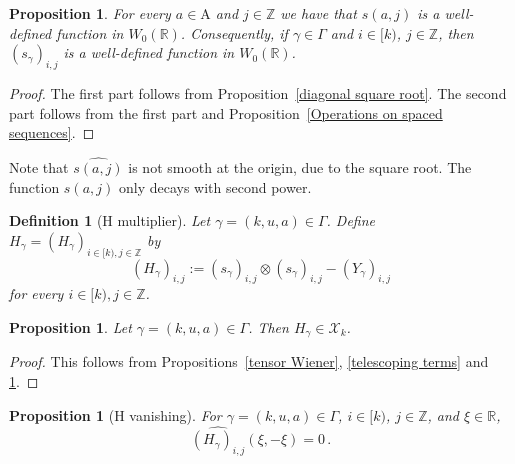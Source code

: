 \documentclass[12pt,reqno]{amsart}
\theoremstyle{plain}
\newtheorem{proposition}[theorem]{Proposition}
\newtheorem{definition}[theorem]{Definition}
\numberwithin{equation}{section}
\theoremstyle{remark}
\newcommand{\uses}[1]{}
\newcommand{\usesdefs}[1]{}
\newcommand{\Z}{{\mathbb Z}}
\newcommand{\R}{{\mathbb R}}
\begin{document}
\begin{proposition}\label{square root Gaussian difference W0}\uses{diagonal square root,Operations on spaced sequences}\usesdefs{auto:Wiener-space-definition,multiplicatively spaced monotone sequences,geometric parameters,square root Gaussian difference,s multiplier}
  For every $a\in\mathrm{A}$ and $j\in\mathbb{Z}$
  we have that $s(a,j)$ is a well-defined function in $W_0(\R)$. Consequently, if $\gamma \in \Gamma$ and $i\in [k)$, $j\in \Z$, then $(s_{\gamma})_{i,j}$ is a well-defined function in $W_0(\R)$.
\end{proposition}

\begin{proof}
The first part follows from Proposition~\ref{diagonal square root}. The second part follows from the first part and Proposition~\ref{Operations on spaced sequences}.
\end{proof}

Note that $\widehat{s(a,j)}$ is not smooth at the origin, due to the square root. The function $s(a,j)$ only decays with second power.


\begin{definition}[H multiplier]\label{H multiplier}\uses{}\usesdefs{geometric parameters,auto:Gaussian-difference-kernel-definition,s multiplier}
Let $\gamma=(k,u,a)\in \Gamma$. Define
    $H_{\gamma}=(H_\gamma)_{i\in [k),j\in \Z}$ by
\begin{equation}\label{auto:H-kernel-definition}
(H_{\gamma})_{i,j}:=(s_{\gamma})_{i,j}\otimes (s_{\gamma})_{i,j}
  -(Y_{\gamma})_{i,j}
\end{equation}
for every $i\in [k), j\in\mathbb{Z}$.
\end{definition}

\begin{proposition}\label{H-in-X}\uses{tensor Wiener,telescoping terms,square root Gaussian difference W0}\usesdefs{geometric parameters,double sequence of 2D functions,H multiplier}
Let $\gamma=(k,u,a)\in \Gamma$. Then $H_{\gamma}\in \mathcal{X}_k$.
\end{proposition}
\begin{proof}
This follows from Propositions~\ref{tensor Wiener}, \ref{telescoping terms} and \ref{square root Gaussian difference W0}.
\end{proof}


\begin{proposition}[H vanishing]\label{H vanishing}\uses{Elementary Gaussian properties,square root Gaussian difference W0}\usesdefs{gaussian,geometric parameters,2D Gaussians,auto:Gaussian-difference-kernel-definition,square root Gaussian difference,s multiplier,H multiplier}
    For $\gamma=(k,u,a)\in \Gamma$, $i\in [k)$, $j\in \Z$, and $\xi\in \R$,
\begin{equation}\label{auto:H-kernel-diagonal-cancellation-Fourier}
    \widehat{(H_{\gamma})_{i,j}}(\xi,-\xi)=0\, .
\end{equation}
\end{proposition}
\end{document}
